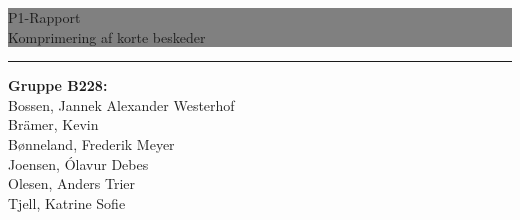 \newcommand{\HRule}[1]{\hfill \rule{0.2\linewidth}{#1}} 

\thispagestyle{empty} 

\noindent \colorbox{grey}{
	 \parbox[t]{1.0\linewidth}{
		\centering \fontsize{50pt}{80pt}\selectfont
		\vspace*{0.7cm}
		P1-Rapport \\[3pt]
        \LARGE Komprimering af korte beskeder \\ 
		\vspace*{0.7cm}
	}
}

\vfill
\flushright
\flushright \rule[10pt]{0.1pt}{160pt}  \begin{minipage}[b]{0.45\linewidth}
{
\Large
\textbf{Gruppe B228:} \\[4pt]
Bossen, Jannek Alexander Westerhof\\[.2cm]
Brämer, Kevin\\[.2cm]
Bønneland, Frederik Meyer\\[.2cm]
Joensen, Ólavur Debes\\[.2cm]
Olesen, Anders Trier\\[.2cm]
Tjell, Katrine Sofie\\[.2cm]
}
\end{minipage}

\clearpage 
